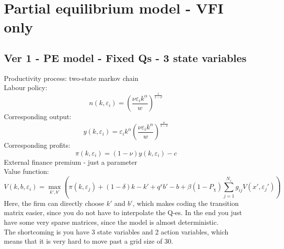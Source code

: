 \documentclass[12pt]{article}
\begin{document}
\section{Partial equilibrium model - VFI only}
\subsection{Ver 1 - PE model - Fixed Qs - 3 state variables}
Productivity process: two-state markov chain \vspace{3mm} \\
Labour policy: 
\begin{equation}
    n(k,\varepsilon_i) = \left( \dfrac{ \nu \varepsilon_i k^\alpha}{w} \right)^{\frac{1}{1-\nu}}
\end{equation}
Corresponding output: 
\begin{equation}
    y(k,\varepsilon_i) = \varepsilon_i k^{\alpha} \left( \dfrac{\nu \varepsilon_i k^\alpha}{w} \right)^{\frac{\nu}{1-\nu}}
\end{equation}
Corresponding profits: 
\begin{equation}
    \pi(k,\varepsilon_i) = (1-\nu) y(k,\varepsilon_i) - c
\end{equation}
External finance premium - just a parameter \vspace{2mm} \\
Value function:
\begin{equation}
     V(k,b, \varepsilon_i) = \max_{k',b'}  \left( \pi(k,\varepsilon_j)+(1-\delta)k - k' +  q^s b' -b  +
            \beta (1-P_\chi) \sum_{j=1}^{N_\varepsilon} g_{ij}  V(x',\varepsilon_j') \right)
\end{equation}
\noindent Here, the firm can directly choose $k'$ and $b'$, which makes coding the transition matrix easier, since you do not have to interpolate the Q-es. In the end you just have some very sparse matrices, since the model is almost deterministic. \vspace{3mm} \\
The shortcoming is you have 3 state variables and 2 action variables, which means that it is very hard to move past a grid size of 30. 

\newpage
\setcounter{equation}{0}
\end{document}
